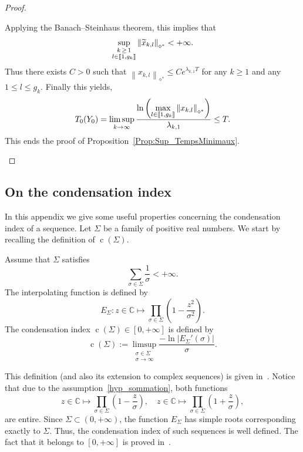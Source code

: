 \documentclass[AHL,Unicode,longabstracts]{cedram}
\newcommand{\llbracket}{\mathopen{[\mkern -2.7mu[}}
\newcommand{\rrbracket}{\mathclose{]\mkern -2.7mu]}}
\newcommand{\inter}[2]{\llbracket #1,#2 \rrbracket}
\newcommand{\Fzp}{Y_0}
\newcommand{\normeXalphas}[1]{\left\| #1 \right\|_{\diamond^*}}
\newcommand{\n}{g}
\newcommand{\C}{\mathbb{C}}
\DeclareMathOperator{\cond}{c}
\let\oldtilde\tilde
\renewcommand*{\tilde}[1]{\mathchoice{\widetilde{#1}}{\widetilde{#1}}{\oldtilde{#1}}{\oldtilde{#1}}}\let\oldexists\exists
\renewcommand*{\exists}{\mathrel{\oldexists}}
\begin{document}
\begin{proof}
\begin{itemize}
Applying the Banach--Steinhaus theorem, this implies that
\[
\sup_{\substack{k\,\geq\,1 \\ l\in \inter{1}{\n_k}}} \normeXalphas{ \tilde{x}_{k,l} } < + \infty.
\]
Thus there exists $C>0$ such that $\normeXalphas{x_{k,l}} \leq C e^{\lambda_{k,1} T}$ for any $k \geq 1$ and any $1\leq l\leq \n_k$. Finally this yields,
\[
T_{0}(\Fzp) = \limsup_{k \to \infty} \frac{\ln \left(\max\limits_{l\in \inter{1}{\n_k}} \normeXalphas{ x_{k,l} } \right)}{\lambda_{k,1}} \leq T.
\]
This ends the proof of Proposition~\ref{Prop:Sup_TempsMinimaux}.
\end{itemize}
\end{proof}



\subsection{On the condensation index} \label{AnnexeCondensation}


In this appendix we give some useful properties concerning the condensation index of a sequence. Let $\Sigma$ be a family of positive real numbers. We start by recalling the definition of $\cond(\Sigma)$.
\begin{defi} \label{Def:Condensation_Shackell}
Assume that $\Sigma$ satisfies
\begin{equation}\label{hyp_sommation}
\sum\limits_{\sigma\in \Sigma} \frac{1}{\sigma} <+\infty.
\end{equation}
The interpolating function is defined by
\begin{equation}\label{DefE}
E_\Sigma : z \in \C \mapsto \prod_{\sigma\in \Sigma}\left(1 - \frac{z^2}{\sigma^2} \right).
\end{equation}
The condensation index $\cond(\Sigma)\in [0,+\infty]$ is defined by
\[
\cond(\Sigma) := \limsup_{\substack{\sigma\in\Sigma\\ \sigma \to \infty}} \frac{- \ln |E_\Sigma'(\sigma)|}{\sigma}.
\]
\end{defi}
This definition (and also its extension to complex sequences) is given in~\cite{Shackell69}. Notice that due to the assumption~\eqref{hyp_sommation}, both functions
\[
z \in \C \mapsto \prod_{\sigma\in \Sigma}\left(1 - \frac{z}{\sigma} \right),
\quad z \in \C \mapsto \prod_{\sigma\in \Sigma}\left(1 + \frac{z}{\sigma} \right),
\]
are entire. Since $\Sigma \subset (0, +\infty)$, the function $E_\Sigma$ has simple roots corresponding exactly to $\Sigma$. Thus, the condensation index of such sequences is well defined. The fact that it belongs to $[0,+\infty]$ is proved in~\cite{AmmarKhodjaBenabdallahGonzalez-BurgosdeTeresa:2014}.
\end{document}
